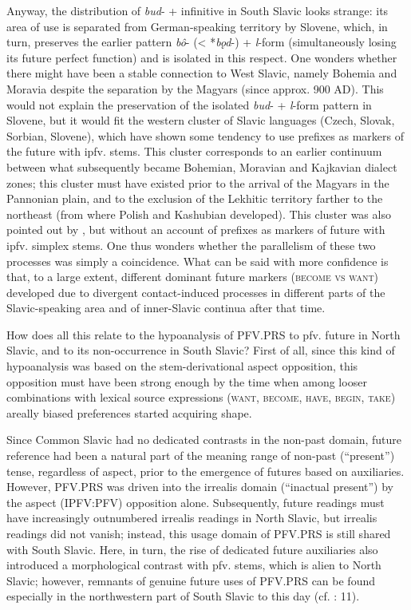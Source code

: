 \documentclass[output=paper,colorlinks,citecolor=brown]{langscibook}
\begin{document}
Anyway, the distribution of \textit{bud}- + infinitive in South Slavic looks strange: its area of use is separated from German-speaking territory by Slovene, which, in turn, preserves the earlier pattern \textit{bô}- (< *\textit{bǫd}-) + \textit{l}-form (simultaneously losing its future perfect function) and is isolated in this respect. One wonders whether there might have been a stable connection to West Slavic, namely Bohemia and Moravia despite the separation by the Magyars (since approx. 900 AD). This would not explain the preservation of the isolated \textit{bud}- + \textit{l}-form pattern in Slovene, but it would fit the western cluster of Slavic languages (Czech, Slovak, Sorbian, Slovene), which have shown some tendency to use prefixes as markers of the future with ipfv. stems. This cluster corresponds to an earlier continuum between what subsequently became Bohemian, Moravian and Kajkavian dialect zones; this cluster must have existed prior to the arrival of the Magyars in the Pannonian plain, and to the exclusion of the Lekhitic territory farther to the northeast (from where Polish and Kashubian developed). This cluster was also pointed out by \citet[25]{andersen_2006b}, but without an account of prefixes as markers of future with ipfv. simplex stems. One thus wonders whether the parallelism of these two processes was simply a coincidence. What can be said with more confidence is that, to a large extent, different dominant future markers (\textsc{become vs want}) developed due to divergent contact-induced processes in different parts of the Slavic-speaking area and of inner-Slavic continua after that time.

How does all this relate to the hypoanalysis of PFV.PRS to pfv. future in North Slavic, and to its non-occurrence in South Slavic? First of all, since this kind of hypoanalysis was based on the stem\hyp{}derivational aspect opposition, this opposition must have been strong enough by the time when among looser combinations with lexical source expressions (\textsc{want, become, have, begin, take}) areally biased preferences started acquiring shape. 

Since Common Slavic had no dedicated contrasts in the non-past domain, future reference had been a natural part of the meaning range of non-past (“present”) tense, regardless of aspect, prior to the emergence of futures based on auxiliaries. However, PFV.PRS was driven into the irrealis domain (“inactual present”) by the aspect (IPFV:PFV) opposition alone. Subsequently, future readings must have increasingly outnumbered irrealis readings in North Slavic, but irrealis readings did not vanish; instead, this usage domain of PFV.PRS is still shared with South Slavic. Here, in turn, the rise of dedicated future auxiliaries also introduced a morphological contrast with pfv. stems, which is alien to North Slavic; however, remnants of genuine future uses of PFV.PRS can be found especially in the northwestern part of South Slavic to this day (cf. \citealt{Grković-Mejdžor2019}: 11). 
\end{document}
